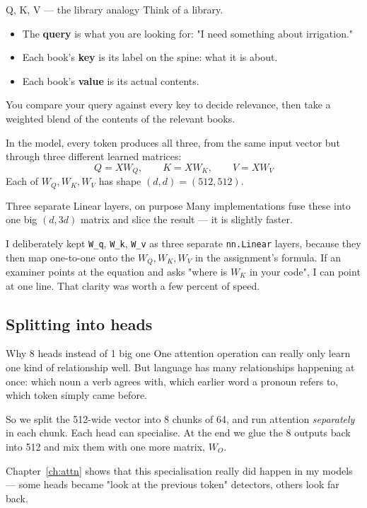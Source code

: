 \documentclass[11pt]{report}
\newcommand{\p}[1]{\texttt{#1}}
\begin{document}
\begin{concept}{Q, K, V --- the library analogy}
Think of a library.

\begin{itemize}[leftmargin=*]
\item The \textbf{query} is what you are looking for: "I need something about
      irrigation."
\item Each book's \textbf{key} is its label on the spine: what it is about.
\item Each book's \textbf{value} is its actual contents.
\end{itemize}

You compare your query against every key to decide relevance, then take a
weighted blend of the contents of the relevant books.

In the model, every token produces all three, from the same input vector but
through three different learned matrices:
\[ Q = XW_Q, \qquad K = XW_K, \qquad V = XW_V \]
Each of $W_Q, W_K, W_V$ has shape $(d,d) = (512,512)$.
\end{concept}

\begin{implementation}{Three separate Linear layers, on purpose}
Many implementations fuse these into one big $(d, 3d)$ matrix and slice the
result --- it is slightly faster.

I deliberately kept \p{W\_q}, \p{W\_k}, \p{W\_v} as three separate
\p{nn.Linear} layers, because they then map one-to-one onto the $W_Q, W_K, W_V$
in the assignment's formula. If an examiner points at the equation and asks
"where is $W_K$ in your code", I can point at one line. That clarity was worth a
few percent of speed.
\end{implementation}

\subsection{Splitting into heads}

\begin{concept}{Why 8 heads instead of 1 big one}
One attention operation can really only learn one kind of relationship well. But
language has many relationships happening at once: which noun a verb agrees with,
which earlier word a pronoun refers to, which token simply came before.

So we split the 512-wide vector into 8 chunks of 64, and run attention
\emph{separately} in each chunk. Each head can specialise. At the end we glue the
8 outputs back into 512 and mix them with one more matrix, $W_O$.

Chapter~\ref{ch:attn} shows that this specialisation really did happen in my
models --- some heads became "look at the previous token" detectors, others look
far back.
\end{concept}
\end{document}
